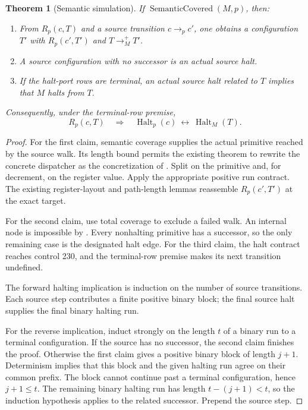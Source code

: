 \documentclass[11pt,letterpaper]{article}
\newtheorem{theorem}{Theorem}[section]
\theoremstyle{definition}\newtheorem{definition}[theorem]{Definition}
\theoremstyle{remark}\newtheorem{remark}[theorem]{Remark}
\newcommand{\code}[1]{\texttt{\detokenize{#1}}}
\newcommand{\Halt}{\operatorname{Halt}}
\newcommand{\SemCov}{\operatorname{SemanticCovered}}
\begin{document}
\begin{theorem}[Semantic simulation]
If $\SemCov(M,p)$, then:
\begin{enumerate}
\item From $R_p(c,T)$ and a source transition $c\longrightarrow_p c'$, one obtains a configuration $T'$ with $R_p(c',T')$ and $T\longrightarrow_M^+T'$.
\item A source configuration with no successor is an actual source halt.
\item If the halt-port rows are terminal, an actual source halt related to $T$ implies that $M$ halts from $T$.
\end{enumerate}
Consequently, under the terminal-row premise,
\[
R_p(c,T)\quad\Longrightarrow\quad
\Halt_p(c)\ \longleftrightarrow\ \Halt_M(T).
\]
\end{theorem}
\begin{proof}
For the first claim, semantic coverage supplies the actual primitive reached by the source walk. Its length bound permits the existing \code{rel_view} theorem to rewrite the concrete dispatcher as the concretization of \code{start Q}. Split on the primitive and, for decrement, on the register value. Apply the appropriate positive run contract. The existing register-layout and path-length lemmas reassemble $R_p(c',T')$ at the exact target.

For the second claim, use total coverage to exclude a failed walk. An internal node is impossible by \code{EdgeSpec}. Every nonhalting primitive has a successor, so the only remaining case is the designated halt edge. For the third claim, the halt contract reaches control 230, and the terminal-row premise makes its next transition undefined.

The forward halting implication is induction on the number of source transitions. Each source step contributes a finite positive binary block; the final source halt supplies the final binary halting run.

For the reverse implication, induct strongly on the length $t$ of a binary run to a terminal configuration. If the source has no successor, the second claim finishes the proof. Otherwise the first claim gives a positive binary block of length $j+1$. Determinism implies that this block and the given halting run agree on their common prefix. The block cannot continue past a terminal configuration, hence $j+1\leq t$. The remaining binary halting run has length $t-(j+1)<t$, so the induction hypothesis applies to the related successor. Prepend the source step.
\end{proof}
\end{document}
